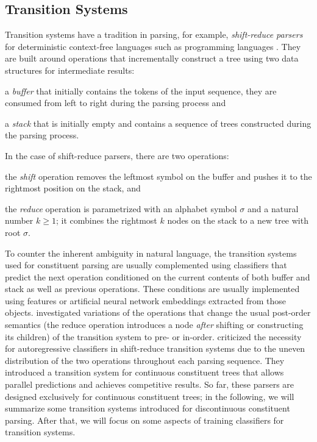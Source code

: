 \documentclass[../document.tex]{subfiles}
\begin{document}
    \subsection{Transition Systems}\label{sec:literature:transition}
    Transition systems have a tradition in parsing, for example, \emph{shift-reduce parsers} for deterministic context-free languages such as programming languages \citep[Section~4.6]{aho2020compilers}.
    They are built around operations that incrementally construct a tree using two data structures for intermediate results:
    \begin{compactitem}
        \item a \emph{buffer} that initially contains the tokens of the input sequence, they are consumed from left to right during the parsing process and
        \item a \emph{stack} that is initially empty and contains a sequence of trees constructed during the parsing process.
    \end{compactitem}
    In the case of shift-reduce parsers, there are two operations:
    \begin{compactitem}
        \item the \emph{shift} operation removes the leftmost symbol on the buffer and pushes it to the rightmost position on the stack, and
        \item the \emph{reduce} operation is parametrized with an alphabet symbol \(\sigma\) and a natural number \(k \ge 1\); it combines the rightmost \(k\) nodes on the stack to a new tree with root \(\sigma\).
    \end{compactitem}
    To counter the inherent ambiguity in natural language, the transition systems used for constituent parsing are usually complemented using classifiers that predict the next operation conditioned on the current contents of both buffer and stack as well as previous operations.
    These conditions are usually implemented using features or artificial neural network embeddings extracted from those objects.
     investigated variations of the operations that change the usual post-order semantics (the reduce operation introduces a node \emph{after} shifting or constructing its children) of the transition system to pre- or in-order.
     criticized the necessity for autoregressive classifiers in shift-reduce transition systems due to the uneven distribution of the two operations throughout each parsing sequence.
    They introduced a transition system for continuous constituent trees that allows parallel predictions and achieves competitive results.
    So far, these parsers are designed exclusively for continuous constituent trees; in the following, we will summarize some transition systems introduced for discontinuous constituent parsing.
    After that, we will focus on some aspects of training classifiers for transition systems.
\end{document}
